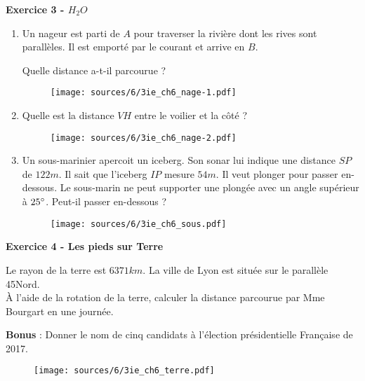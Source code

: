 \documentclass[10pt]{article}
\begin{document}
\begin{multicols}{3}

  \textbf{Exercice 3 - $H_{2}O$}
  \begin{enumerate}
  \item[1.] Un nageur est parti de $A$ pour traverser la rivière dont les rives sont parallèles. Il est emporté par le courant et arrive en $B$. 
    
    Quelle distance a-t-il parcourue ?
    \begin{figure}[H]
      \centering
      \texttt{[image: sources/6/3ie\_ch6\_nage-1.pdf]}
    \end{figure}
  \item[2.]Quelle est la distance $VH$ entre le voilier et la côté ?
    \begin{figure}[H]
      \centering
      \texttt{[image: sources/6/3ie\_ch6\_nage-2.pdf]}
    \end{figure}
  \item[3.] Un sous-marinier apercoit un iceberg. Son sonar lui indique une distance $SP$ de $122m$. Il sait que l'iceberg $IP$ mesure $54m$. Il veut plonger pour passer en-dessous. Le sous-marin ne peut supporter une plongée avec un angle supérieur à $25\degree$. Peut-il passer en-dessous ?
    \begin{figure}[H]
      \centering
      \texttt{[image: sources/6/3ie\_ch6\_sous.pdf]}
    \end{figure}
  \end{enumerate}

\end{multicols}


\begin{multicols}{2}

  \textbf{Exercice 4 - Les pieds sur Terre} 
  
  Le rayon de la terre est $6 371 km$. La ville de Lyon est située sur le parallèle 45\degree Nord. \\
  À l'aide de la rotation de la terre, calculer la distance parcourue par Mme Bourgart en une journée.
  
  \textbf{Bonus} : Donner le nom de cinq candidats à l'élection présidentielle Française de 2017.
  
  \begin{figure}[H]
    \centering
    \texttt{[image: sources/6/3ie\_ch6\_terre.pdf]}
  \end{figure}

\end{multicols}
\end{document}
